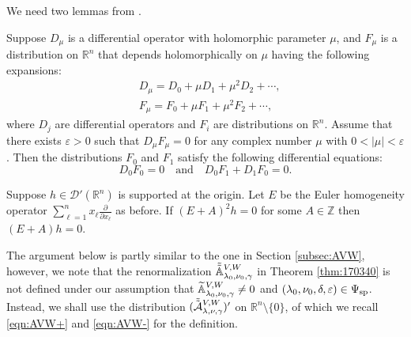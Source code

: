 We need two lemmas from \cite{sbon}.  
\begin{lemma}
\label{lem:sbon1110}
Suppose $D_\mu$ is a differential operator with holomorphic parameter $\mu$,
and $F_\mu$ is a distribution on $\mathbb{R}^n$
that depends holomorphically on $\mu$
having the following expansions:
\begin{align*}
&D_\mu = D_0 + \mu D_1 + \mu^2 D_2 + \dotsb ,
\\
&F_\mu = F_0 + \mu  F_1 + \mu^2 F_2 + \dotsb, 
\end{align*}
where $D_j$ are differential operators
 and $F_i$ are distributions on ${\mathbb{R}}^n$.  
Assume that there exists $\varepsilon>0$
 such that $D_\mu F_\mu = 0$ for any
complex number $\mu$ with $0 < |\mu| < \varepsilon$.  
Then the distributions $F_0$ and $F_{1}$ satisfy
the following differential equations:
\[
D_0 F_0 = 0  \quad\text{and}\quad 
D_0 F_1 + D_1 F_0 = 0.
\]
\end{lemma}
\begin{lemma}
\label{lem:sbon1111}
Suppose $h \in \mathcal{D}' (\mathbb{R}^n)$
is supported at the origin.  
Let $E$ be the 
Euler homogeneity operator
 $\sum_{\ell=1}^n x_{\ell} \frac {\partial}{\partial x_{\ell}}$ as before.  
If
$(E + A)^2  h = 0$
for some $A \in \mathbb{Z}$ then
$(E + A) h = 0$.  
\end{lemma}

The argument below is partly similar
 to the one in Section \ref{subsec:AVW}, 
 however, 
 we note that the renormalization 
$
   \tilde{\tilde{{\mathbb{A}}}}_{{\lambda_0},{\nu_0},{\gamma}}^{{V,W}}
$
 in Theorem \ref{thm:170340} is not defined 
 under our assumption
 that ${\widetilde{\mathbb{A}}}_{{\lambda_0},{\nu_0},{\gamma}}^{{V,W}} \ne 0$
 and $(\lambda_0, \nu_0, \delta, \varepsilon) \in \Psi_{{\operatorname{sp}}}$.  
Instead, 
we shall use the distribution
 $(\tilde{\tilde{{\mathcal{A}}}}_{{\lambda},{\nu},{\gamma}}^{{V,W}})'$
 on ${\mathbb{R}}^n \setminus \{0\}$, 
 of which we recall \eqref{eqn:AVW+} and \eqref{eqn:AVW-}
 for the definition.   

